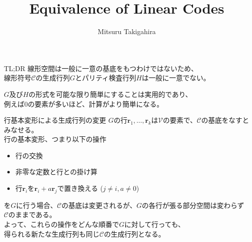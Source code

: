 \documentclass[dvipdfmx,10pt,jsarticle]{beamer}
\title{Equivalence of Linear Codes}
\author{Mitsuru Takigahira}
\date[2017/11/24]{}
\begin{document}
  \frame{\maketitle}
  \begin{frame}{TL;DR}
    線形空間は一般に一意の基底をもつわけではないため、 \\ 
    線形符号$\mathcal{C}$の生成行列$G$とパリティ検査行列$H$は一般に一意でない。

    $G$及び$H$の形式を可能な限り簡単にすることは実用的であり、\\
    例えば$0$の要素が多いほど、計算がより簡単になる。
  \end{frame}

  \begin{frame}{行基本変形による生成行列の変更}
    $G$の行$\mathbf{r}_1, \ldots, \mathbf{r}_k$は$\mathcal{V}$の要素で、$\mathcal{C}$の基底をなすとみなせる。\\
    行の基本変形、つまり以下の操作
    \begin{itemize}
      \item 行の交換
      \item 非零な定数と行との掛け算
      \item 行$\mathbf{r}_i$を$\mathbf{r}_i + a\mathbf{r}_j$で置き換える ($j \neq i, a \neq 0$)
    \end{itemize}
    を$G$に行う場合、$\mathcal{C}$の基底は変更されるが、$G$の各行が張る部分空間は変わらず\\ 
    $\mathcal{C}$のままである。\\
    よって、これらの操作をどんな順番で$G$に対して行っても、 \\
    得られる新たな生成行列も同じ$\mathcal{C}$の生成行列となる。
  \end{frame}
\end{document}

